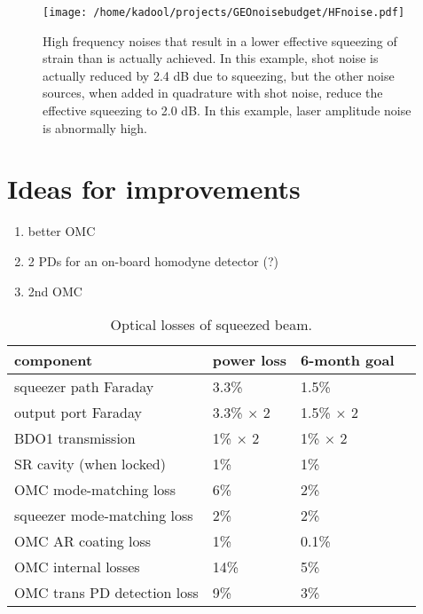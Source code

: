 \documentclass{ligodoc}
\begin{document}
\begin{figure}
\begin{centering}
\texttt{[image: /home/kadool/projects/GEOnoisebudget/HFnoise.pdf]}
\caption{High frequency noises that result in a lower effective
  squeezing of strain than is actually achieved. In this example, shot
  noise is actually reduced by 2.4 dB due to squeezing, but the other
  noise sources, when added in quadrature with shot noise, reduce the
  effective squeezing to 2.0 dB. In this example, laser amplitude
  noise is abnormally high.}
\label{fig:HFnoises}
\end{centering}
\end{figure}


\section{Ideas for improvements}
\label{sec:future}

\begin{enumerate}
\item better OMC
\item 2 PDs for an on-board homodyne detector (?)
\item 2nd OMC
\end{enumerate}



\begin{table}
\centering
\caption{Optical losses of squeezed beam.}
\begin{tabular}{l l l l} %
\hline
component & power loss & 6-month goal \\
\hline
squeezer path Faraday & 3.3\% & 1.5\% \\
output port Faraday & 3.3\% $\times$ 2 & 1.5\% $\times$ 2 \\
BDO1 transmission & 1\% $\times$ 2 & 1\% $\times$ 2 \\
SR cavity (when locked) & 1\% & 1\% \\
OMC mode-matching loss & 6\% & 2\% \\
squeezer mode-matching loss & 2\% & 2\% \\
OMC AR coating loss & 1\% & 0.1\% \\
OMC internal losses & 14\% & 5\% \\
OMC trans PD detection loss & 9\% & 3\% \\
\hline
\end{tabular}
\label{tab:losses_goal}
\end{table}
\end{document}

